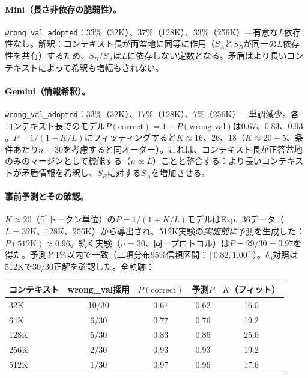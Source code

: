 \documentclass[11pt,a4paper]{article}
\begin{document}
\paragraph{Mini（長さ非依存の脆弱性）。} \texttt{wrong\_val\_adopted}：33\%（32K）、37\%（128K）、33\%（256K）---有意な$L$依存性なし。解釈：コンテキスト長が両盆地に同等に作用（$S_A$と$S_B$が同一の$L$依存性を共有）するため、$S_B/S_A$は$L$に依存しない定数となる。矛盾はより長いコンテキストによって希釈も増幅もされない。

\paragraph{Gemini（情報希釈）。} \texttt{wrong\_val\_adopted}：33\%（32K）、17\%（128K）、7\%（256K）---単調減少。各コンテキスト長でのモデル$P(\text{correct}) = 1 - P(\text{wrong\_val})$は$0.67$、$0.83$、$0.93$。$P = 1/(1 + K/L)$にフィッティングすると$K \approx 16$、$26$、$18$（$K \approx 20 \pm 5$、条件あたり$n = 30$を考慮すると同オーダー）。これは、コンテキスト長が正答盆地のみのマージンとして機能する（$\mu \propto L$）ことと整合する：より長いコンテキストが矛盾情報を希釈し、$S_B$に対する$S_A$を増加させる。

\paragraph{事前予測とその確認。} $K \approx 20$（千トークン単位）の$P = 1/(1 + K/L)$モデルはExp.~36データ（$L = 32\text{K}$、$128\text{K}$、$256\text{K}$）から導出され、512K実験の\emph{実施前に}予測を生成した：$P(512\text{K}) \approx 0.96$。続く実験（$n = 30$、同一プロトコル）は$P = 29/30 = 0.97$を得た。予測と1\%以内で一致（二項分布95\%信頼区間：$[0.82, 1.00]$）。$\delta_0$対照は512Kで$30/30$正解を確認した。全軌跡：

\begin{center}
\begin{tabular}{lcccc}
\toprule
コンテキスト & wrong\_val採用 & $P(\text{correct})$ & 予測$P$ & $K$（フィット） \\
\midrule
32K  & 10/30 & 0.67 & 0.62 & 16.0 \\
64K  &  6/30 & 0.77 & 0.76 & 19.2 \\
128K &  5/30 & 0.83 & 0.86 & 25.6 \\
256K &  2/30 & 0.93 & 0.93 & 19.2 \\
512K &  1/30 & 0.97 & 0.96 & 17.6 \\
\bottomrule
\end{tabular}
\end{center}
\end{document}
